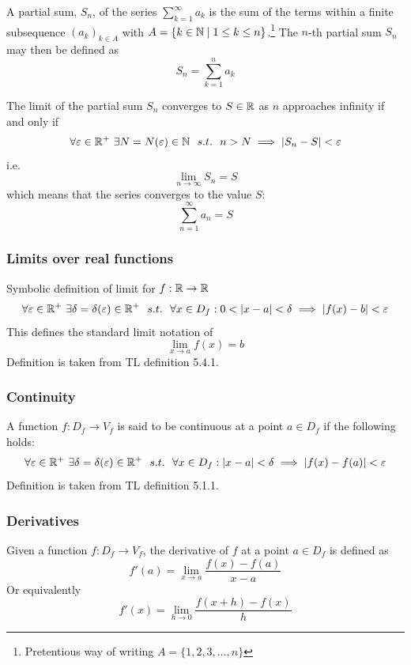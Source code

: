 A partial sum, \(S_n\), of the series \(\sum_{k=1}^{\infty}a_k\) is the sum of the terms within a finite subsequence \((a_k)_{k \in A}\) with \(A = \{k \in \mathbb{N} \mid 1 \le k \le n\}\).\footnote{Pretentious way of writing \(A = \{1,2,3,\dots,n\}\)} The \(n\)-th partial sum \(S_n\) may then be defined as
\begin{equation}
    S_n = \sum_{k=1}^{n}a_k
\end{equation}

The limit of the partial sum \(S_n\) converges to \(S \in \mathbb{R}\) as \(n\) approaches infinity if and only if
\begin{equation}
    \forall \varepsilon \in \mathbb{R}^+ \ \exists N = N(\varepsilon) \in \mathbb{N} \ \ s.t. \ \  n > N \implies |S_n - S| < \varepsilon
\end{equation}
i.e.
\begin{equation}
    \lim_{n\to \infty}S_n = S
\end{equation}
which means that the series converges to the value \(S\):
\begin{equation}
    \sum_{n=1}^{\infty}a_n = S
\end{equation}


\subsubsection{Limits over real functions}
Symbolic definition of limit for \(f : \mathbb{R} \to \mathbb{R}\)
\begin{equation}
    \forall \varepsilon \in \mathbb{R}^{+} \ \exists \delta = \delta(\varepsilon) \in \mathbb{R}^{+} \ \ s.t. \ \  \forall x \in D_f : 0 < |x - a| < \delta \implies |f(x) - b| < \varepsilon
\end{equation}
This defines the standard limit notation of
\begin{equation}
    \lim_{x \to a} f(x) = b
\end{equation}
Definition is taken from TL definition 5.4.1.

\subsubsection{Continuity}
A function \(f : D_f \to V_f\) is said to be continuous at a point \(a \in D_f\) if the following holds:
\begin{equation}
    \forall \varepsilon \in \mathbb{R}^+ \ \exists \delta = \delta(\varepsilon) \in \mathbb{R}^+ \ \ s.t. \ \  \forall x \in D_f : |x - a| < \delta \implies |f(x) - f(a)| < \varepsilon
\end{equation}
Definition is taken from TL definition 5.1.1.

\subsubsection{Derivatives}
Given a function \(f : D_f \to V_f\), the derivative of \(f\) at a point \(a \in D_f\) is defined as
\begin{equation}
    f'(a) = \lim_{x \to a}\frac{f(x) - f(a)}{x - a}
\end{equation}
Or equivalently
\begin{equation}
    f'(x) = \lim_{h \to 0}\frac{f(x + h) - f(x)}{h}
\end{equation}
